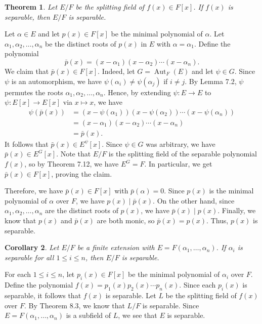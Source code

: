 \documentclass[10pt]{article}
\makeatletter
\DeclareMathOperator{\Aut}{Aut}
\theoremstyle{newstyle}
\newtheorem{thm}{Theorem}[section]
\newtheorem{cor}[thm]{Corollary}
\newenvironment{pf}[1][\proofname]{\par
  \pushQED{\qed}%
  \normalfont \topsep0\p@\relax
  \trivlist
  \item[\hskip\labelsep\scshape
  #1\@addpunct{.}]\ignorespaces
}{%
  \popQED\endtrivlist\@endpefalse
}
\makeatother
\begin{document}
\begin{thm}
Let $E/F$ be the splitting field of $f(x) \in F[x]$. If $f(x)$ is separable, then $E/F$ is 
separable. 
\end{thm}
\begin{pf}
Let $\alpha \in E$ and let $p(x) \in F[x]$ be the minimal polynomial of $\alpha$. Let 
$\alpha_1, \alpha_2, \dots, \alpha_n$ be the distinct roots of $p(x)$ in $E$ with $\alpha = \alpha_1$. 
Define the polynomial 
\[ \bar p(x) = (x-\alpha_1) (x - \alpha_2) \cdots (x - \alpha_n). \]
We claim that $\bar p(x) \in F[x]$. Indeed, let $G = \Aut_F(E)$ and let $\psi \in G$. 
Since $\psi$ is an automorphism, we have $\psi(\alpha_i) \neq \psi(\alpha_j)$ if $i \neq j$. 
By Lemma 7.2, $\psi$ permutes the roots $\alpha_1, \alpha_2, \dots, \alpha_n$. 
Hence, by extending $\psi : E \to E$ to $\psi : E[x] \to E[x]$ via $x \mapsto x$, we have 
\begin{align*}
    \psi(\bar p(x)) &= (x - \psi(\alpha_1))(x - \psi(\alpha_2)) \cdots (x - \psi(\alpha_n)) \\
    &= (x - \alpha_1)(x - \alpha_2) \cdots (x - \alpha_n) \\
    &= \bar p(x).
\end{align*}
It follows that $\bar p(x) \in E^\psi[x]$. Since $\psi \in G$ was arbitrary, we have $\bar p(x) 
\in E^G[x]$. Note that $E/F$ is the splitting field of the separable polynomial $f(x)$, so 
by Theorem 7.12, we have $E^G = F$. In particular, we get $\bar p(x) \in F[x]$, proving the claim.

Therefore, we have $\bar p(x) \in F[x]$ with $\bar p(\alpha) = 0$. Since $p(x)$ is the 
minimal polynomial of $\alpha$ over $F$, we have $p(x) \mid \bar p(x)$. On the other hand, 
since $\alpha_1, \alpha_2, \dots, \alpha_n$ are the distinct roots of $p(x)$, 
we have $\bar p(x) \mid p(x)$. Finally, we know that $p(x)$ and $\bar p(x)$ are both monic, so 
$\bar p(x) = p(x)$. Thus, $p(x)$ is separable. 
\end{pf}

\begin{cor}
Let $E/F$ be a finite extension with $E = F(\alpha_1, \dots, \alpha_n)$. If $\alpha_i$ is 
separable for all $1 \leq i \leq n$, then $E/F$ is separable. 
\end{cor}
\begin{pf}
For each $1 \leq i \leq n$, let $p_i(x) \in F[x]$ be the minimal polynomial of $\alpha_i$ over $F$. 
Define the polynomial $f(x) = p_1(x)p_2(x) \cdots p_n(x)$. Since each $p_i(x)$ is separable, 
it follows that $f(x)$ is separable. Let $L$ be the splitting field of $f(x)$ over $F$. 
By Theorem 8.3, we know that $L/F$ is separable. Since $E = F(\alpha_1, \dots, \alpha_n)$ 
is a subfield of $L$, we see that $E$ is separable. 
\end{pf}
\end{document}
